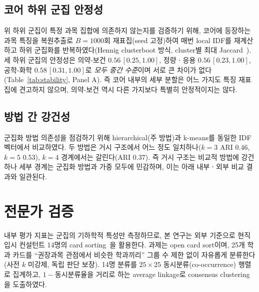 \documentclass[conference]{IEEEtran}
\begin{document}
\subsection{코어 하위 군집 안정성}

위 하위 군집이 특정 과목 집합에 의존하지 않는지를 검증하기 위해, 코어에 등장하는 과목 특징을 복원추출로 $B=1000$회 재표집(seed 고정)하여 매번 local IDF를 재계산하고 하위 군집화를 반복하였다(Hennig clusterboot 방식, cluster별 최대 Jaccard~\cite{hennig2007,efron1979}).
세 하위 군집의 안정성은 의약-보건 $0.56\,[0.25,1.00]$, 정량ㆍ응용 $0.56\,[0.23,1.00]$, 공학-화학 $0.58\,[0.31,1.00]$로 \emph{모두 중간 수준}이며 서로 큰 차이가 없다(Table~\ref{tab:stability}, Panel A).
즉 코어 내부의 세부 분할은 어느 가지도 특징 재표집에 견고하지 않으며, 의약-보건 역시 다른 가지보다 특별히 안정적이지는 않다.

\subsection{방법 간 강건성}

군집화 방법 의존성을 점검하기 위해 hierarchical(주 방법)과 k-means를 동일한 IDF 벡터에서 비교하였다.
두 방법은 거시 구조에서 어느 정도 일치하나($k=3$ ARI $0.46$, $k=5$ $0.53$), $k=4$ 경계에서는 갈린다(ARI $0.37$).
즉 거시 구조는 비교적 방법에 강건하나 세부 경계는 군집화 방법과 가중 모두에 민감하며, 이는 아래 내부ㆍ외부 비교 결과와 일관된다.

\section{전문가 검증}

내부 평가 지표는 군집의 기하학적 특성만 측정하므로, 본 연구는 외부 기준으로 현직 입시 컨설턴트 14명의 card sorting~\cite{spencer2009}을 활용한다.
과제는 open card sort이며, 25개 학과 카드를 ``권장과목 관점에서 비슷한 학과끼리'' 그룹 수 제한 없이 자유롭게 분류한다(사전 $k$ 미강제, 독립 판단 보장).
14명 분류를 $25\times25$ 동시분류(co-occurrence) 행렬로 집계하고, $1-$동시분류율을 거리로 하는 average linkage로 consensus clustering을 도출하였다.
\end{document}

